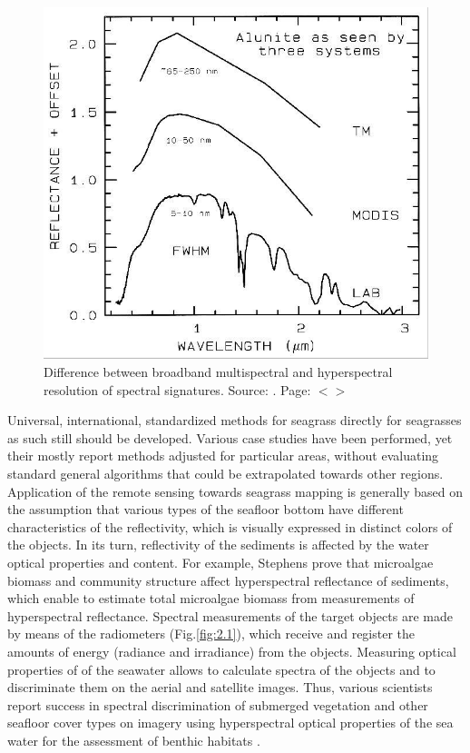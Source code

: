 \documentclass[11pt]{article}
\begin{document}
\begin{figure}
	\centering
	\includegraphics[scale=0.25]{Fig-12.jpg}
	\caption{Difference between broadband multispectral and hyperspectral resolution of
		spectral signatures. Source: \cite{Clark99}\label{Clark99}. Page: $<$\pageref{page-20}$>$}
	\label{fig:2.3}
\end{figure}

Universal, international, standardized methods for seagrass directly for seagrasses
as such still should be developed. Various case studies have been performed, yet their mostly report
methods adjusted for particular areas, without evaluating standard general algorithms that could be
extrapolated towards other regions. \\ Application of the remote sensing towards seagrass mapping is
generally based on the assumption that various types of the seafloor bottom have different
characteristics of the reflectivity, which is visually expressed in distinct colors of the objects. In its
turn, reflectivity of the sediments is affected by the water optical properties and content. For
example, Stephens \cite{Stephens03}\label{Stephens03} prove that microalgae biomass and community structure affect
hyperspectral reflectance of sediments, which enable to estimate total microalgae biomass from
measurements of hyperspectral reflectance. 
Spectral measurements of the target objects are made
by means of the radiometers (Fig.\ref{fig:2.1})\label{page-17}, which receive and register the amounts of energy (radiance and
irradiance) from the objects. Measuring optical properties of of the seawater allows to calculate spectra of the
objects and to discriminate them on the aerial and satellite images. Thus, various scientists report
success in spectral discrimination of submerged vegetation and other seafloor cover types on imagery
using hyperspectral optical properties of the sea water for the assessment of benthic habitats \cite{Lewis01,Louchard03,Dehouck08,Werdell03}\label{Lewis01}\label{Louchard03}\label{Dehouck08}\label{Werdell03}.
\end{document}
